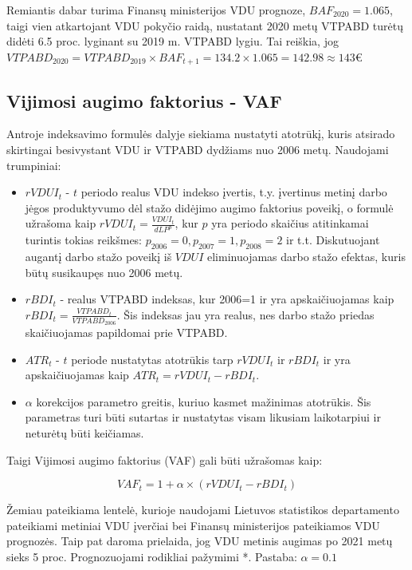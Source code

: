 \documentclass[titlepage, 11pt]{article}
\begin{document}
Remiantis dabar turima Finansų ministerijos VDU prognoze, $BAF_{2020}=1.065$, taigi vien atkartojant VDU pokyčio raidą, nustatant 2020 metų VTPABD turėtų didėti 6.5 proc. lyginant su 2019 m. VTPABD lygiu. Tai reiškia, jog $VTPABD_{2020}=VTPABD_{2019} \times BAF_{t+1}=134.2 \times 1.065=142.98 \approx 143$€

\newpage

\subsection{Vijimosi augimo faktorius - VAF}
Antroje indeksavimo formulės dalyje siekiama nustatyti atotrūkį, kuris atsirado skirtingai besivystant VDU ir VTPABD dydžiams nuo 2006 metų.
Naudojami trumpiniai:

\begin{itemize}
\item $rVDUI_{t}$ - $t$ periodo realus VDU indekso įvertis, t.y. įvertinus metinį darbo jėgos produktyvumo dėl stažo didėjimo augimo faktorius poveikį, o  formulė užrašoma kaip $rVDUI_{t}=\frac{VDUI_{t}}{dLP^p}$, kur $p$ yra periodo skaičius atitinkamai turintis tokias reikšmes: $p_{2006}=0,p_{2007}=1,p_{2008}=2$ ir t.t. Diskutuojant augantį darbo stažo poveikį iš $VDUI$ eliminuojamas darbo stažo efektas, kuris būtų susikaupęs nuo 2006 metų.
\item $rBDI_{t}$ - realus VTPABD indeksas, kur 2006=1 ir yra apskaičiuojamas kaip $rBDI_{t}=\frac{VTPABD_{t}}{VTPABD_{2006}}$. Šis indeksas jau yra realus, nes darbo stažo priedas skaičiuojamas papildomai prie VTPABD.
\item $ATR_{t}$ - $t$ periode nustatytas atotrūkis  tarp $rVDUI_{t}$ ir $rBDI_{t}$ ir yra apskaičiuojamas kaip $ATR_{t}=rVDUI_{t}-rBDI_{t}$. 
\item $\alpha$ korekcijos parametro greitis, kuriuo kasmet mažinimas atotrūkis. Šis parametras turi būti sutartas ir nustatytas visam likusiam laikotarpiui ir neturėtų būti keičiamas.
\end{itemize}

Taigi Vijimosi augimo faktorius (VAF) gali būti užrašomas kaip:

\begin{equation}
VAF_{t}= 1+ \alpha \times	(rVDUI_{t}-rBDI_{t})
\end{equation}

Žemiau pateikiama lentelė, kurioje naudojami Lietuvos statistikos departamento pateikiami metiniai VDU įverčiai bei Finansų ministerijos pateikiamos VDU prognozės. Taip pat daroma prielaida, jog VDU metinis augimas po 2021 metų sieks 5 proc. Prognozuojami rodikliai pažymimi *. Pastaba: $\alpha=0.1$
\end{document}
